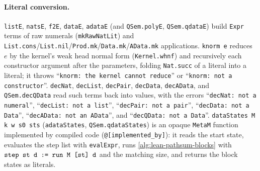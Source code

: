 \paragraph{Literal conversion.} \textnormal{\texttt{listE}}, \textnormal{\texttt{natsE}}, \textnormal{\texttt{f2E}}, \textnormal{\texttt{dataE}}, \textnormal{\texttt{adataE}}
(and \textnormal{\texttt{QSem.\allowbreak{}polyE}}, \textnormal{\texttt{QSem.\allowbreak{}qdataE}}) build \textnormal{\texttt{Expr}} terms of raw numerals
(\textnormal{\texttt{mkRawNatLit}}) and \textnormal{\texttt{List.\allowbreak{}cons}}/\textnormal{\texttt{List.\allowbreak{}nil}}/\textnormal{\texttt{Prod.\allowbreak{}mk}}/\textnormal{\texttt{Data.\allowbreak{}mk}}/\textnormal{\texttt{AData.\allowbreak{}mk}}
applications. \textnormal{\texttt{knorm e}} reduces $e$ by the kernel's weak head normal form
(\textnormal{\texttt{Kernel.\allowbreak{}whnf}}) and recursively each constructor argument after the parameters, folding
\textnormal{\texttt{Nat.\allowbreak{}succ}} of a literal into a literal; it throws ``\texttt{knorm: the kernel cannot reduce}''
or ``\texttt{knorm: not a constructor}''. \textnormal{\texttt{decNat}}, \textnormal{\texttt{decList}}, \textnormal{\texttt{decPair}},
\textnormal{\texttt{decData}}, \textnormal{\texttt{decAData}}, and \textnormal{\texttt{QSem.\allowbreak{}decQData}} read such terms back into values, with
the errors ``\texttt{decNat: not a numeral}'', ``\texttt{decList: not a list}'',
``\texttt{decPair: not a pair}'', ``\texttt{decData: not a Data}'',
``\texttt{decAData: not an AData}'', and ``\texttt{decQData: not a Data}''.
\textnormal{\texttt{dataStates M k w s0 sts}} (\textnormal{\texttt{adataStates}}, \textnormal{\texttt{QSem.\allowbreak{}qdataStates}}) is an opaque
\textnormal{\texttt{MetaM}} function implemented by compiled code (\textnormal{\texttt{@[implemented\_\allowbreak{}by]}}): it reads the start
state, evaluates the step list with \textnormal{\texttt{evalExpr}}, runs \cref{alg:lean-pathsum-blocks} with
$\textnormal{\texttt{step st d := run M [st] d}}$ and the matching size, and returns the block states as literals.


